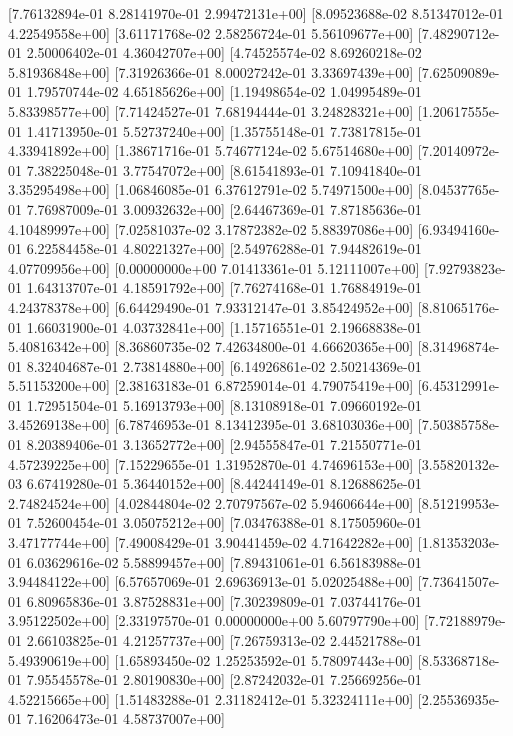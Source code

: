  [7.76132894e-01 8.28141970e-01 2.99472131e+00]
 [8.09523688e-02 8.51347012e-01 4.22549558e+00]
 [3.61171768e-02 2.58256724e-01 5.56109677e+00]
 [7.48290712e-01 2.50006402e-01 4.36042707e+00]
 [4.74525574e-02 8.69260218e-02 5.81936848e+00]
 [7.31926366e-01 8.00027242e-01 3.33697439e+00]
 [7.62509089e-01 1.79570744e-02 4.65185626e+00]
 [1.19498654e-02 1.04995489e-01 5.83398577e+00]
 [7.71424527e-01 7.68194444e-01 3.24828321e+00]
 [1.20617555e-01 1.41713950e-01 5.52737240e+00]
 [1.35755148e-01 7.73817815e-01 4.33941892e+00]
 [1.38671716e-01 5.74677124e-02 5.67514680e+00]
 [7.20140972e-01 7.38225048e-01 3.77547072e+00]
 [8.61541893e-01 7.10941840e-01 3.35295498e+00]
 [1.06846085e-01 6.37612791e-02 5.74971500e+00]
 [8.04537765e-01 7.76987009e-01 3.00932632e+00]
 [2.64467369e-01 7.87185636e-01 4.10489997e+00]
 [7.02581037e-02 3.17872382e-02 5.88397086e+00]
 [6.93494160e-01 6.22584458e-01 4.80221327e+00]
 [2.54976288e-01 7.94482619e-01 4.07709956e+00]
 [0.00000000e+00 7.01413361e-01 5.12111007e+00]
 [7.92793823e-01 1.64313707e-01 4.18591792e+00]
 [7.76274168e-01 1.76884919e-01 4.24378378e+00]
 [6.64429490e-01 7.93312147e-01 3.85424952e+00]
 [8.81065176e-01 1.66031900e-01 4.03732841e+00]
 [1.15716551e-01 2.19668838e-01 5.40816342e+00]
 [8.36860735e-02 7.42634800e-01 4.66620365e+00]
 [8.31496874e-01 8.32404687e-01 2.73814880e+00]
 [6.14926861e-02 2.50214369e-01 5.51153200e+00]
 [2.38163183e-01 6.87259014e-01 4.79075419e+00]
 [6.45312991e-01 1.72951504e-01 5.16913793e+00]
 [8.13108918e-01 7.09660192e-01 3.45269138e+00]
 [6.78746953e-01 8.13412395e-01 3.68103036e+00]
 [7.50385758e-01 8.20389406e-01 3.13652772e+00]
 [2.94555847e-01 7.21550771e-01 4.57239225e+00]
 [7.15229655e-01 1.31952870e-01 4.74696153e+00]
 [3.55820132e-03 6.67419280e-01 5.36440152e+00]
 [8.44244149e-01 8.12688625e-01 2.74824524e+00]
 [4.02844804e-02 2.70797567e-02 5.94606644e+00]
 [8.51219953e-01 7.52600454e-01 3.05075212e+00]
 [7.03476388e-01 8.17505960e-01 3.47177744e+00]
 [7.49008429e-01 3.90441459e-02 4.71642282e+00]
 [1.81353203e-01 6.03629616e-02 5.58899457e+00]
 [7.89431061e-01 6.56183988e-01 3.94484122e+00]
 [6.57657069e-01 2.69636913e-01 5.02025488e+00]
 [7.73641507e-01 6.80965836e-01 3.87528831e+00]
 [7.30239809e-01 7.03744176e-01 3.95122502e+00]
 [2.33197570e-01 0.00000000e+00 5.60797790e+00]
 [7.72188979e-01 2.66103825e-01 4.21257737e+00]
 [7.26759313e-02 2.44521788e-01 5.49390619e+00]
 [1.65893450e-02 1.25253592e-01 5.78097443e+00]
 [8.53368718e-01 7.95545578e-01 2.80190830e+00]
 [2.87242032e-01 7.25669256e-01 4.52215665e+00]
 [1.51483288e-01 2.31182412e-01 5.32324111e+00]
 [2.25536935e-01 7.16206473e-01 4.58737007e+00]
